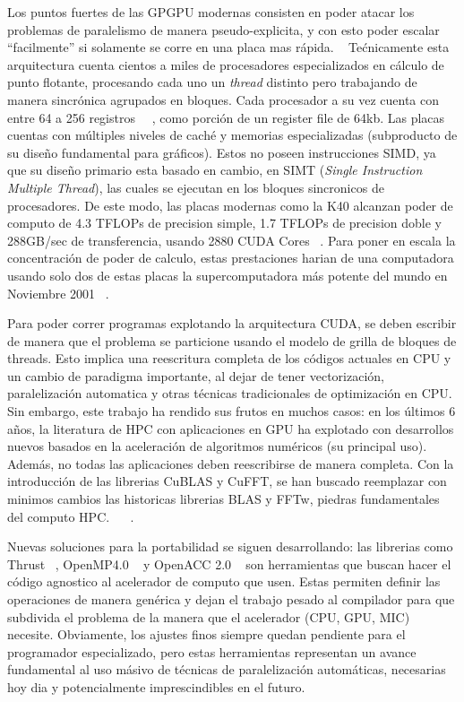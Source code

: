 Los puntos fuertes de las GPGPU modernas consisten en poder atacar los problemas de paralelismo
de manera pseudo-explicita, y con esto poder escalar ``facilmente'' si solamente se corre en una
placa mas r\'apida. ~\cite{} Te\'cnicamente esta arquitectura cuenta cientos a miles de procesadores
especializados en c\'alculo de punto flotante, procesando cada uno un \textit{thread} distinto pero
trabajando de manera sincr\'onica agrupados en bloques. Cada procesador a su vez cuenta con entre
64 a 256 registros ~\cite{NvidiaFermi}~\cite{NvidiaKepler}, como porci\'on de un register file de 64kb.
Las placas cuentas con m\'ultiples niveles de cach\'e y memorias especializadas (subproducto de
su dise\~no fundamental para gr\'aficos). Estos no poseen instrucciones SIMD, ya que su dise\~no primario
esta basado en cambio, en SIMT (\textit{Single Instruction Multiple Thread}), las cuales se ejecutan en los
bloques sincronicos de procesadores. De este modo, las placas modernas como la K40 alcanzan
poder de computo de 4.3 TFLOPs de precision simple, 1.7 TFLOPs de precision doble y 288GB/sec de
transferencia, usando 2880 CUDA Cores ~\cite{NvidiaKeplerDatasheet}. Para poner en escala la concentraci\'on
de poder de calculo, estas prestaciones harian de una computadora usando solo dos de estas placas
la supercomputadora m\'as potente del mundo en Noviembre 2001 ~\cite{Top500November2001}.

Para poder correr programas explotando la arquitectura CUDA, se deben escribir de manera que
el problema se particione usando el modelo de grilla de bloques de threads. Esto implica una
reescritura completa de los c\'odigos actuales en CPU y un cambio de paradigma importante, al
dejar de tener vectorizaci\'on, paralelizaci\'on automatica y otras t\'ecnicas tradicionales
de optimizaci\'on en CPU. Sin embargo, este trabajo ha rendido sus frutos en muchos casos:
en los \'ultimos 6 a\~nos, la literatura de HPC con aplicaciones en GPU ha explotado con
desarrollos nuevos basados en la aceleraci\'on de algoritmos num\'ericos (su principal uso).
Adem\'as, no todas las aplicaciones deben reescribirse de manera completa. Con la introducci\'on
de las librerias CuBLAS y CuFFT, se han buscado reemplazar con minimos cambios las historicas
librerias BLAS y FFTw, piedras fundamentales del computo HPC. ~\cite{cublas} ~\cite{cufft}.

Nuevas soluciones para la portabilidad se siguen desarrollando: las librerias como Thrust ~\cite{thrust},
OpenMP4.0 ~\cite{OpenMPspec} y OpenACC 2.0 ~\cite{OpenACCSpec} son herramientas que buscan hacer el
c\'odigo agnostico al acelerador de computo que usen. Estas permiten definir las operaciones de
manera gen\'erica y dejan el trabajo pesado al compilador para que subdivida el problema de la manera
que el acelerador (CPU, GPU, MIC) necesite. Obviamente, los ajustes finos siempre quedan pendiente para
el programador especializado, pero estas herramientas representan un avance fundamental al uso
m\'asivo de t\'ecnicas de paralelizaci\'on autom\'aticas, necesarias hoy dia y potencialmente
imprescindibles en el futuro.

